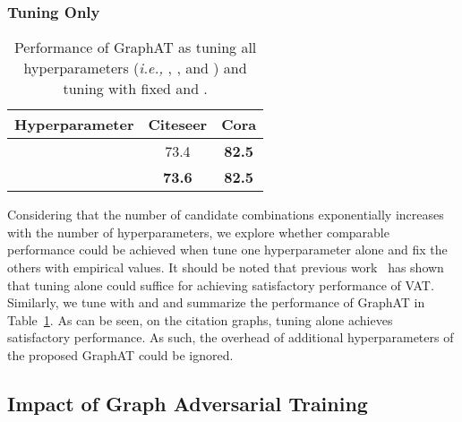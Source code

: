 \documentclass[10pt,journal,compsoc]{IEEEtran}
\newcommand{\ie}{\emph{i.e., }}
\begin{document}
\subsubsection{Tuning  Only}
\begin{table}[]
	\centering
	\caption{Performance of GraphAT as tuning all hyperparameters (\ie , , and ) and tuning  with fixed  and .}
	\vspace{-0.2cm}
	\label{tab:epsilon_perf}
\begin{tabular}{c|cc}
		\hline
		Hyperparameter & Citeseer & Cora \\ \hline \hline
		 & 73.4 & \textbf{82.5} \\
		 & \textbf{73.6} & \textbf{82.5} \\ \hline
	\end{tabular}\end{table}
Considering that the number of candidate combinations exponentially increases with the number of hyperparameters, we explore whether comparable performance could be achieved when tune one hyperparameter alone and fix the others with empirical values. It should be noted that previous work~\cite{miyato2018virtual} has shown that tuning  alone could suffice for achieving satisfactory performance of VAT. Similarly, we tune  with  and  and summarize the performance of GraphAT in Table~\ref{tab:epsilon_perf}. As can be seen, on the citation graphs, tuning  alone achieves satisfactory performance. 
As such, the overhead of additional hyperparameters of the proposed GraphAT could be ignored.

\subsection{Impact of Graph Adversarial Training}
\end{document}
